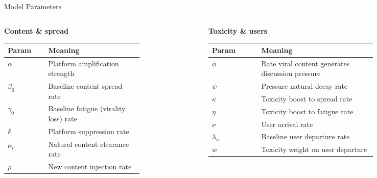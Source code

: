 \documentclass[aspectratio=169,11pt]{beamer}
\begin{document}
\begin{frame}{Model Parameters}
  \small
  \begin{columns}[T]
    \begin{column}{0.48\textwidth}
      \textbf{Content \& spread}\\[4pt]
      \begin{tabular}{@{}lp{0.70\linewidth}@{}}
        \toprule
        Param & Meaning \\
        \midrule
        $\alpha$   & Platform amplification strength \\
        $\beta_0$  & Baseline content spread rate \\
        $\gamma_0$ & Baseline fatigue (virality loss) rate \\
        $\delta$   & Platform suppression rate \\
        $\mu_c$    & Natural content clearance rate \\
        $\rho$     & New content injection rate \\
        \bottomrule
      \end{tabular}
    \end{column}
    \begin{column}{0.48\textwidth}
      \textbf{Toxicity \& users}\\[4pt]
      \begin{tabular}{@{}lp{0.70\linewidth}@{}}
        \toprule
        Param & Meaning \\
        \midrule
        $\phi$      & Rate viral content generates discussion pressure \\
        $\psi$      & Pressure natural decay rate \\
        $\kappa$    & Toxicity boost to spread rate \\
        $\eta$      & Toxicity boost to fatigue rate \\
        $\nu$       & User arrival rate \\
        $\lambda_u$ & Baseline user departure rate \\
        $w$         & Toxicity weight on user departure \\
        \bottomrule
      \end{tabular}
    \end{column}
  \end{columns}
\end{frame}
\end{document}
